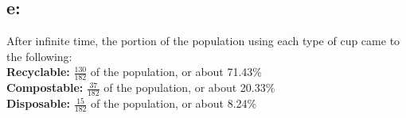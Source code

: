\documentclass{article}
\begin{document}
\subsection*{e:}
After infinite time, the portion of the population using each type of cup came to the following:
\\\textbf{Recyclable:} $\frac{130}{182}$ of the population, or about 71.43\%
\\\textbf{Compostable:} $\frac{37}{182}$ of the population, or about 20.33\%
\\\textbf{Disposable:} $\frac{15}{182}$ of the population, or about 8.24\%
\end{document}
